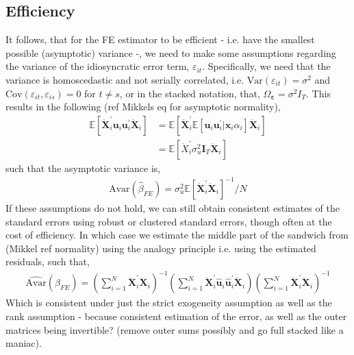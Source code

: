 \subsection{Efficiency}

It follows, that for the FE estimator to be efficient - i.e. have the smallest possible (asymptotic) variance -, we need to make some assumptions regarding the variance of the idiosyncratic error term, $\varepsilon_{it}$. Specifically, we need that the variance is homoscedastic and not serially correlated, i.e. $\text{Var}(\varepsilon_{it}) = \sigma^2$ and $\text{Cov}(\varepsilon_{it}, \varepsilon_{is}) = 0$ for $t \neq s$, or in the stacked notation, that, $\Omega_{\bm{\varepsilon}} = \sigma^2 I_T$. This results in the following (ref Mikkels eq for asymptotic normality), 
\begin{align*}
    \mathbb{E}\left[ \bm{\ddot{X}}_i^\prime \bm{u}_i \bm{u}_i^\prime \bm{\ddot{X}}_i \right] &= \mathbb{E}\left[ \bm{\ddot{X}}_i^\prime \mathbb{E}[\bm{u}_i \bm{u}_i^\prime | \bm{x}_i \alpha_i]\bm{\ddot{X}}_i \right] \\
    &= \mathbb{E}[\ddot{X}_i^\prime \sigma_u^2 \bm{I}_T \bm{\ddot{X}}_i]
\end{align*}
such that the asymptotic variance is,
\begin{align*}
    \text{Avar}(\hat{\beta}_{FE}) = \sigma_u^2 \mathbb{E}[\bm{\ddot{X}}_i^\prime \bm{\ddot{X}}_i]^{-1} / N
\end{align*}
If these assumptions do not hold, we can still obtain consistent estimates of the standard errors using robust or clustered standard errors, though often at the cost of efficiency. In which case we estimate the middle part of the sandwich from (Mikkel ref normality) using the analogy principle i.e. using the estimated residuals, such that, 
\begin{align*}
    \hat{\text{Avar}}(\hat{\beta}_{FE}) = \left( \sum_{i=1}^N \bm{\ddot{X}}_i^\prime \bm{\ddot{X}}_i \right)^{-1} \left( \sum_{i=1}^N \bm{\ddot{X}}_i^\prime \hat{\bm{u}}_i \hat{\bm{u}}_i^\prime \bm{\ddot{X}}_i \right) \left( \sum_{i=1}^N \bm{\ddot{X}}_i^\prime \bm{\ddot{X}}_i \right)^{-1}
\end{align*} 
Which is consistent under just the strict exogeneity assumption as well as the rank assumption - because consistent estimation of the error, as well as the outer matrices being invertible? (remove outer sums possibly and go full stacked like a maniac). 